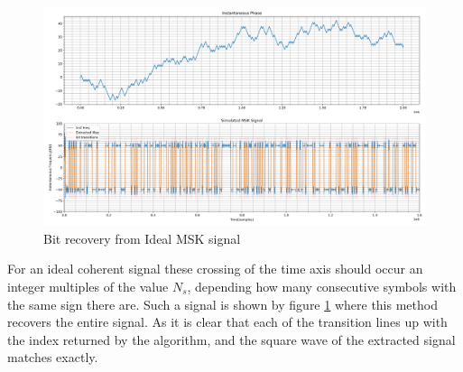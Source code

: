 \begin{figure}[h!]
    \centering
    \includegraphics[width = \textwidth]{figs/sim/symRecovery/ideal_demod.png}
    \caption{Bit recovery from Ideal MSK signal}
    \label{fig:idealBits}
\end{figure}

For an ideal coherent signal these crossing of the time axis should occur an integer multiples of the value $N_s$, depending how many consecutive symbols with the same sign there are. Such a signal is shown by figure \ref{fig:idealBits} where this method recovers the entire signal. As it is clear that each of the transition lines up with the index returned by the algorithm, and the square wave of the extracted signal matches exactly.

